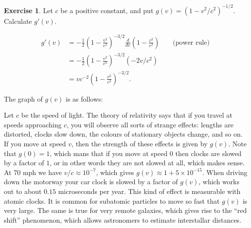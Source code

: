 \documentclass[a4paper]{book}
\renewcommand{\:}{\colon}
\theoremstyle{definition}
\newtheorem{exercise}[theorem]{Exercise}
\renewenvironment{solution}{\SolutionInline}{\endSolutionInline}
\begin{document}
\begin{exercise}
 Let $c$ be a positive constant, and put $g(v)=(1-v^2/c^2)^{-1/2}$.
 Calculate $g'(v)$.
\end{exercise}
\begin{solution}
 \begin{align*}
  g'(v) &= -\tfrac{1}{2}\left(1-\frac{v^2}{c^2}\right)^{-3/2}
            \frac{d}{dv}\left(1-\frac{v^2}{c^2}\right) 
        && \text{ (power rule) } \\
        &= -\tfrac{1}{2}\left(1-\frac{v^2}{c^2}\right)^{-3/2}
            (-2v/c^2) \\
        &= vc^{-2}\left(1-\frac{v^2}{c^2}\right)^{-3/2}.
 \end{align*}
\end{solution}
\begin{background}
 The graph of $g(v)$ is as follows:
 \begin{center}
 \end{center}
 Let $c$ be the speed of light.  The theory of relativity says that if
 you travel at speeds approaching $c$, you will observe all sorts of
 strange effects: lengths are distorted, clocks slow down, the colours
 of stationary objects change, and so on.  If you move at speed $v$,
 then the strength of these effects is given by $g(v)$.  Note that
 $g(0)=1$, which mans that if you move at speed $0$ then clocks are
 slowed by a factor of $1$, or in other words they are not slowed at
 all, which makes sense.  At 70 mph we have $v/c\approx 10^{-7}$,
 which gives $g(v)\approx 1 + 5\times 10^{-15}$.  When driving down the
 motorway your car clock is slowed by a factor of $g(v)$, which works
 out to about $0.15$ microseconds per year.  This kind of effect is
 measurable with atomic clocks.  It is common for subatomic particles
 to move so fast that $g(v)$ is very large.  The same is true for very
 remote galaxies, which gives rise to the ``red shift'' phenomenon,
 which allows astronomers to estimate interstallar distances.
\end{background}
\end{document}
